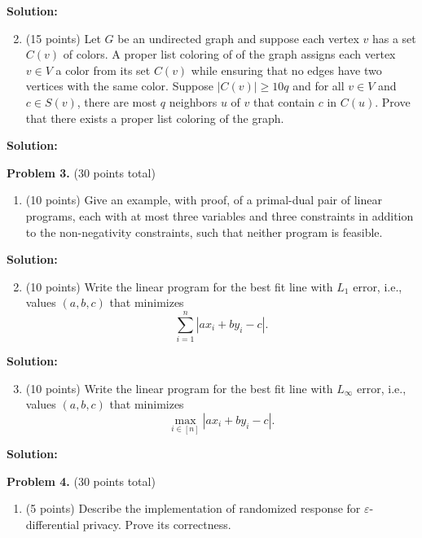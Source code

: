\documentclass[11pt]{article}
\newcommand{\eps}{\varepsilon}
\begin{document}
\noindent\textbf{Solution:}

\begin{enumerate}
\setcounter{enumi}{1}
\item (15 points)
Let $G$ be an undirected graph and suppose each vertex $v$ has a set $C(v)$ of colors. 
A proper list coloring of of the graph assigns each vertex $v\in V$ a color from its set $C(v)$ while ensuring that no edges have two vertices with the same color. 
Suppose $|C(v)|\ge 10q$ and for all $v\in V$ and $c\in S(v)$, there are most $q$ neighbors $u$ of $v$ that contain $c$ in $C(u)$. 
Prove that there exists a proper list coloring of the graph. 
\end{enumerate}

\noindent\textbf{Solution:}



\newpage\noindent
\textbf{Problem 3.} (30 points total)
\begin{enumerate}
\item (10 points)
Give an example, with proof, of a primal-dual pair of linear programs, each with at most three variables and three constraints in addition to the non-negativity constraints, such that neither program is feasible. 
\end{enumerate}

\noindent\textbf{Solution:}

\begin{enumerate}
\setcounter{enumi}{1}
\item (10 points)
Write the linear program for the best fit line with $L_1$ error, i.e., values $(a,b,c)$ that minimizes 
\[\sum_{i=1}^n|ax_i+by_i-c|.\]
\end{enumerate}

\noindent\textbf{Solution:}

\begin{enumerate}
\setcounter{enumi}{2}
\item (10 points)
Write the linear program for the best fit line with $L_\infty$ error, i.e., values $(a,b,c)$ that minimizes 
\[\max_{i\in[n]}|ax_i+by_i-c|.\] 
\end{enumerate}

\noindent\textbf{Solution:}


\newpage\noindent
\textbf{Problem 4.} (30 points total)
\begin{enumerate}
\item (5 points)
Describe the implementation of randomized response for $\eps$-differential privacy. 
Prove its correctness.
\end{enumerate}
\end{document}
